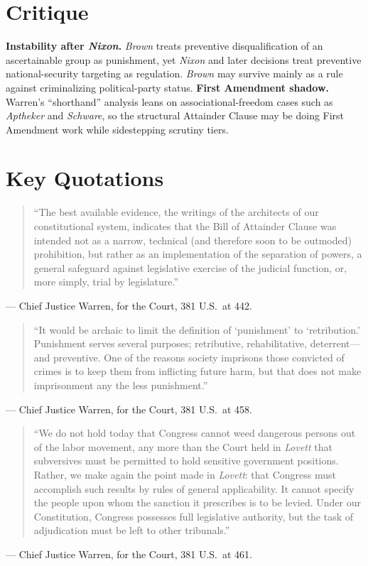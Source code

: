 \documentclass[12pt]{article}
\begin{document}
\section{Critique}

\textbf{Instability after \textit{Nixon}.} \textit{Brown} treats preventive disqualification of an ascertainable group as punishment, yet \textit{Nixon} and later decisions treat preventive national-security targeting as regulation. \textit{Brown} may survive mainly as a rule against criminalizing political-party status. \textbf{First Amendment shadow.} Warren's ``shorthand'' analysis leans on associational-freedom cases such as \textit{Aptheker} and \textit{Schware}, so the structural Attainder Clause may be doing First Amendment work while sidestepping scrutiny tiers.

\section{Key Quotations}

\begin{quote}
``The best available evidence, the writings of the architects of our constitutional system, indicates that the Bill of Attainder Clause was intended not as a narrow, technical (and therefore soon to be outmoded) prohibition, but rather as an implementation of the separation of powers, a general safeguard against legislative exercise of the judicial function, or, more simply, trial by legislature.''
\end{quote}
\noindent --- Chief Justice Warren, for the Court, 381 U.S.\ at 442.

\begin{quote}
``It would be archaic to limit the definition of `punishment' to `retribution.' Punishment serves several purposes; retributive, rehabilitative, deterrent---and preventive. One of the reasons society imprisons those convicted of crimes is to keep them from inflicting future harm, but that does not make imprisonment any the less punishment.''
\end{quote}
\noindent --- Chief Justice Warren, for the Court, 381 U.S.\ at 458.

\begin{quote}
``We do not hold today that Congress cannot weed dangerous persons out of the labor movement, any more than the Court held in \textit{Lovett} that subversives must be permitted to hold sensitive government positions. Rather, we make again the point made in \textit{Lovett}: that Congress must accomplish such results by rules of general applicability. It cannot specify the people upon whom the sanction it prescribes is to be levied. Under our Constitution, Congress possesses full legislative authority, but the task of adjudication must be left to other tribunals.''
\end{quote}
\noindent --- Chief Justice Warren, for the Court, 381 U.S.\ at 461.
\end{document}
